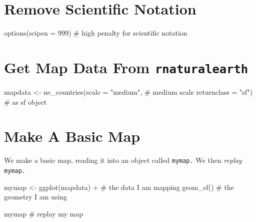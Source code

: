 \documentclass[
  letterpaper,
  DIV=11,
  numbers=noendperiod,
  oneside]{scrreprt}
\newenvironment{Shaded}{\begin{snugshade}}{\end{snugshade}}
\newcommand{\AttributeTok}[1]{\textcolor[rgb]{0.40,0.45,0.13}{#1}}
\newcommand{\CommentTok}[1]{\textcolor[rgb]{0.37,0.37,0.37}{#1}}
\newcommand{\DecValTok}[1]{\textcolor[rgb]{0.68,0.00,0.00}{#1}}
\newcommand{\FunctionTok}[1]{\textcolor[rgb]{0.28,0.35,0.67}{#1}}
\newcommand{\NormalTok}[1]{\textcolor[rgb]{0.00,0.23,0.31}{#1}}
\newcommand{\OtherTok}[1]{\textcolor[rgb]{0.00,0.23,0.31}{#1}}
\newcommand{\SpecialCharTok}[1]{\textcolor[rgb]{0.37,0.37,0.37}{#1}}
\newcommand{\StringTok}[1]{\textcolor[rgb]{0.13,0.47,0.30}{#1}}
\begin{document}
\section{Remove Scientific Notation}\label{remove-scientific-notation}

\begin{Shaded}
\begin{Highlighting}[]
\FunctionTok{options}\NormalTok{(}\AttributeTok{scipen =} \DecValTok{999}\NormalTok{) }\CommentTok{\# high \textquotesingle{}penalty\textquotesingle{} for scientific notation}
\end{Highlighting}
\end{Shaded}

\section{\texorpdfstring{Get Map Data From
\texttt{rnaturalearth}}{Get Map Data From rnaturalearth}}\label{get-map-data-from-rnaturalearth}

\begin{Shaded}
\begin{Highlighting}[]
\NormalTok{mapdata }\OtherTok{\textless{}{-}} \FunctionTok{ne\_countries}\NormalTok{(}\AttributeTok{scale =} \StringTok{"medium"}\NormalTok{, }\CommentTok{\# medium scale}
                        \AttributeTok{returnclass =} \StringTok{"sf"}\NormalTok{)  }\CommentTok{\# as sf object}
\end{Highlighting}
\end{Shaded}

\section{Make A Basic Map}\label{make-a-basic-map}

We make a basic map, reading it into an object called \texttt{mymap.} We
then \emph{replay} \texttt{mymap.}

\begin{Shaded}
\begin{Highlighting}[]
\NormalTok{mymap }\OtherTok{\textless{}{-}} \FunctionTok{ggplot}\NormalTok{(mapdata) }\SpecialCharTok{+} \CommentTok{\# the data I am mapping}
  \FunctionTok{geom\_sf}\NormalTok{() }\CommentTok{\# the geometry I am using}

\NormalTok{mymap }\CommentTok{\# replay my map}
\end{Highlighting}
\end{Shaded}
\end{document}
